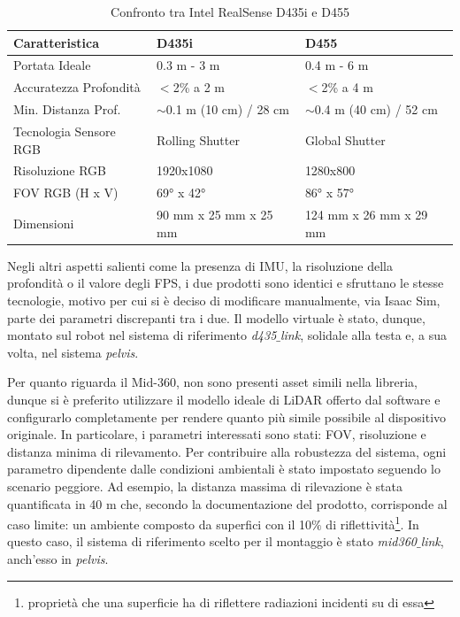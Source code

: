 \begin{table}[h]
    \centering
    \begin{tabular}{|l|l|l|}
    \hline
    \textbf{Caratteristica}                 & \textbf{D435i} & \textbf{D455} \\   \hline
    Portata Ideale                           & 0.3 m - 3 m                   & 0.4 m - 6 m                  \\ \hline
    Accuratezza Profondità                   & $<$2\% a 2 m                    & $<$2\% a 4 m                   \\ \hline
    Min. Distanza Prof.                      & $\sim$0.1 m (10 cm) / 28 cm & $\sim$0.4 m (40 cm) / 52 cm \\ 
    \hline
    Tecnologia Sensore RGB                   & Rolling Shutter               & Global Shutter               \\ \hline
    Risoluzione RGB                          & 1920x1080                     & 1280x800                     \\  \hline
    FOV RGB (H x V)                          & 69° x 42°                     & 86° x 57°      \\   \hline
    Dimensioni                               & 90 mm x 25 mm x 25 mm         & 124 mm x 26 mm x 29 mm       \\ \hline
    \end{tabular}
    \caption{Confronto tra Intel RealSense D435i e D455}
    \label{tab:realsense_comparison}
\end{table}

Negli altri aspetti salienti come la presenza di IMU, la risoluzione della profondità o il valore degli FPS, i due prodotti sono identici e sfruttano le stesse tecnologie, motivo per cui si è deciso di modificare manualmente, via Isaac Sim, parte dei parametri discrepanti tra i due. Il modello virtuale è stato, dunque, montato sul robot nel sistema di riferimento \textit{d435$\_$link}, solidale alla testa e, a sua volta, nel sistema \textit{pelvis}. 

Per quanto riguarda il Mid-360, non sono presenti asset simili nella libreria, dunque si è preferito utilizzare il modello ideale di LiDAR offerto dal software e configurarlo completamente per rendere quanto più simile possibile al dispositivo originale. In particolare, i parametri interessati sono stati: FOV, risoluzione e distanza minima di rilevamento. Per contribuire alla robustezza del sistema, ogni parametro dipendente dalle condizioni ambientali è stato impostato seguendo lo scenario peggiore. Ad esempio, la distanza massima di rilevazione è stata quantificata in 40 m che, secondo la documentazione del prodotto, corrisponde al caso limite: un ambiente composto da superfici con il 10$\%$ di riflettività\footnote{proprietà che una superficie ha di riflettere radiazioni incidenti su di essa}.  In questo caso, il sistema di riferimento scelto per il montaggio è stato \textit{mid360$\_$link}, anch'esso in \textit{pelvis}.

